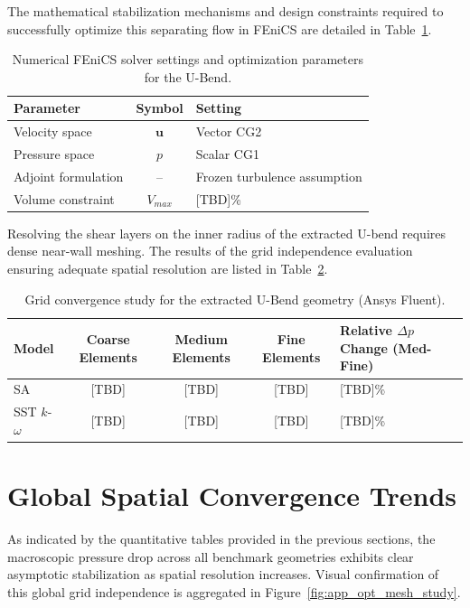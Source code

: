 The mathematical stabilization mechanisms and design constraints required to successfully optimize this separating flow in FEniCS are detailed in Table~\ref{tab:app_ubend_numerical}.

\begin{table}[htbp]
	\centering
	\footnotesize
	\caption{Numerical FEniCS solver settings and optimization parameters for the U-Bend.}
	\label{tab:app_ubend_numerical}
	\renewcommand{\arraystretch}{1.2}
	\begin{tabularx}{\textwidth}{l c X}
		\hline
		\textbf{Parameter} & \textbf{Symbol} & \textbf{Setting} \\
		\hline
		Velocity space & $\mathbf{u}$ & Vector CG2 \\
		Pressure space & $p$ & Scalar CG1 \\
		Adjoint formulation & -- & Frozen turbulence assumption \\
		Volume constraint & $V_{max}$ & [TBD]\% \\
		\hline
	\end{tabularx}
\end{table}

Resolving the shear layers on the inner radius of the extracted U-bend requires dense near-wall meshing. The results of the grid independence evaluation ensuring adequate spatial resolution are listed in Table~\ref{tab:app_ubend_mesh}.

\begin{table}[htbp]
	\centering
	\footnotesize
	\caption{Grid convergence study for the extracted U-Bend geometry (Ansys Fluent).}
	\label{tab:app_ubend_mesh}
	\renewcommand{\arraystretch}{1.2}
	\begin{tabularx}{\textwidth}{l c c c X}
		\hline
		\textbf{Model} & \textbf{Coarse Elements} & \textbf{Medium Elements} & \textbf{Fine Elements} & \textbf{Relative $\Delta p$ Change (Med-Fine)} \\
		\hline
		SA & [TBD] & [TBD] & [TBD] & [TBD]\% \\
		SST $k$-$\omega$ & [TBD] & [TBD] & [TBD] & [TBD]\% \\
		\hline
	\end{tabularx}
\end{table}

\section{Global Spatial Convergence Trends}
As indicated by the quantitative tables provided in the previous sections, the macroscopic pressure drop across all benchmark geometries exhibits clear asymptotic stabilization as spatial resolution increases. Visual confirmation of this global grid independence is aggregated in Figure~\ref{fig:app_opt_mesh_study}.


